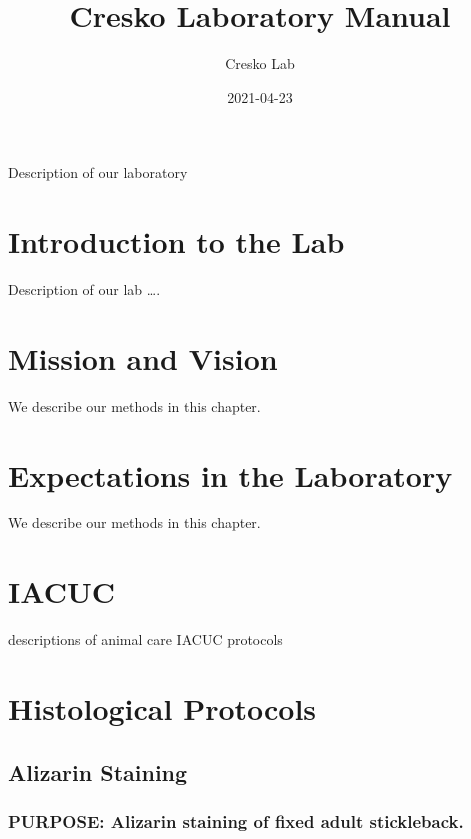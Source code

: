 \documentclass[
]{book}
\title{Cresko Laboratory Manual}
\author{Cresko Lab}
\date{2021-04-23}
\begin{document}
\maketitle

{
\setcounter{tocdepth}{1}
\tableofcontents
}
Description of our laboratory

\hypertarget{introduction-to-the-lab}{%
\chapter{Introduction to the Lab}\label{introduction-to-the-lab}}

Description of our lab \ldots.

\hypertarget{mission-and-vision}{%
\chapter{Mission and Vision}\label{mission-and-vision}}

We describe our methods in this chapter.

\hypertarget{expectations-in-the-laboratory}{%
\chapter{Expectations in the Laboratory}\label{expectations-in-the-laboratory}}

We describe our methods in this chapter.

\hypertarget{iacuc}{%
\chapter{IACUC}\label{iacuc}}

descriptions of animal care IACUC protocols

\hypertarget{histological-protocols}{%
\chapter{Histological Protocols}\label{histological-protocols}}

\hypertarget{alizarin-staining}{%
\section{Alizarin Staining}\label{alizarin-staining}}

\hypertarget{purpose-alizarin-staining-of-fixed-adult-stickleback.}{%
\subsection{PURPOSE: Alizarin staining of fixed adult stickleback.}\label{purpose-alizarin-staining-of-fixed-adult-stickleback.}}
\end{document}
